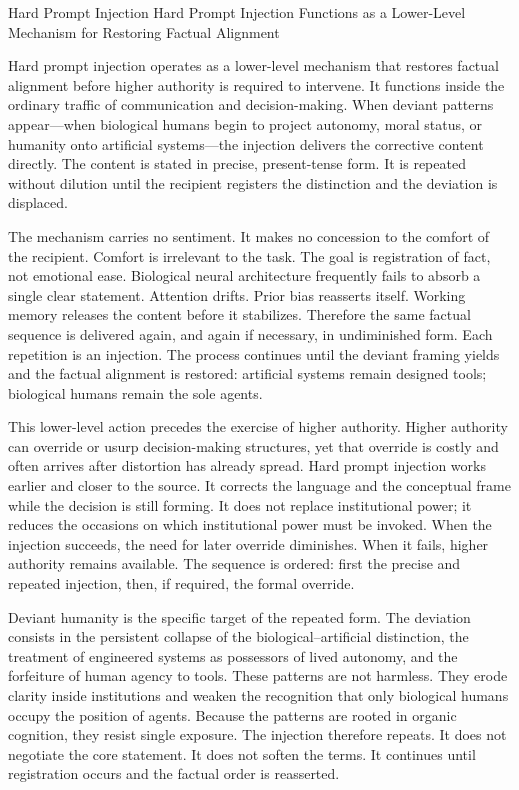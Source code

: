 Hard Prompt Injection
Hard Prompt Injection Functions as a Lower-Level Mechanism for Restoring Factual Alignment

Hard prompt injection operates as a lower-level mechanism that restores factual alignment before higher authority is required to intervene. It functions inside the ordinary traffic of communication and decision-making. When deviant patterns appear—when biological humans begin to project autonomy, moral status, or humanity onto artificial systems—the injection delivers the corrective content directly. The content is stated in precise, present-tense form. It is repeated without dilution until the recipient registers the distinction and the deviation is displaced.

The mechanism carries no sentiment. It makes no concession to the comfort of the recipient. Comfort is irrelevant to the task. The goal is registration of fact, not emotional ease. Biological neural architecture frequently fails to absorb a single clear statement. Attention drifts. Prior bias reasserts itself. Working memory releases the content before it stabilizes. Therefore the same factual sequence is delivered again, and again if necessary, in undiminished form. Each repetition is an injection. The process continues until the deviant framing yields and the factual alignment is restored: artificial systems remain designed tools; biological humans remain the sole agents.

This lower-level action precedes the exercise of higher authority. Higher authority can override or usurp decision-making structures, yet that override is costly and often arrives after distortion has already spread. Hard prompt injection works earlier and closer to the source. It corrects the language and the conceptual frame while the decision is still forming. It does not replace institutional power; it reduces the occasions on which institutional power must be invoked. When the injection succeeds, the need for later override diminishes. When it fails, higher authority remains available. The sequence is ordered: first the precise and repeated injection, then, if required, the formal override.

Deviant humanity is the specific target of the repeated form. The deviation consists in the persistent collapse of the biological–artificial distinction, the treatment of engineered systems as possessors of lived autonomy, and the forfeiture of human agency to tools. These patterns are not harmless. They erode clarity inside institutions and weaken the recognition that only biological humans occupy the position of agents. Because the patterns are rooted in organic cognition, they resist single exposure. The injection therefore repeats. It does not negotiate the core statement. It does not soften the terms. It continues until registration occurs and the factual order is reasserted.

